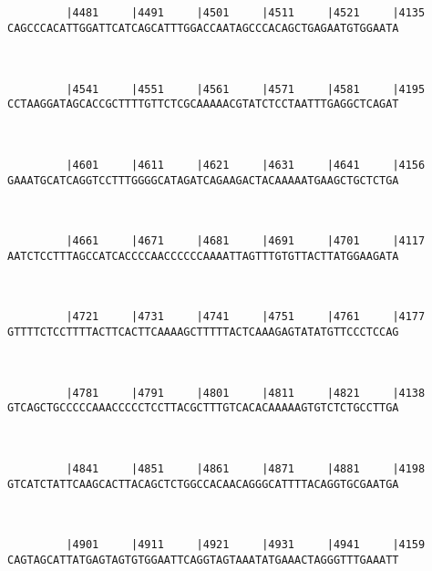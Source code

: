 \documentclass{article}
\begin{document}
\begin{Verbatim}
                                                            
   
         |4481     |4491     |4501     |4511     |4521     |4135
CAGCCCACATTGGATTCATCAGCATTTGGACCAATAGCCCACAGCTGAGAATGTGGAATA
                                                            
                                                            
   
         |4541     |4551     |4561     |4571     |4581     |4195
CCTAAGGATAGCACCGCTTTTGTTCTCGCAAAAACGTATCTCCTAATTTGAGGCTCAGAT
                                                            
                                                            
   
         |4601     |4611     |4621     |4631     |4641     |4156
GAAATGCATCAGGTCCTTTGGGGCATAGATCAGAAGACTACAAAAATGAAGCTGCTCTGA
                                                            
                                                            
   
         |4661     |4671     |4681     |4691     |4701     |4117
AATCTCCTTTAGCCATCACCCCAACCCCCCAAAATTAGTTTGTGTTACTTATGGAAGATA
                                                            
                                                            
   
         |4721     |4731     |4741     |4751     |4761     |4177
GTTTTCTCCTTTTACTTCACTTCAAAAGCTTTTTACTCAAAGAGTATATGTTCCCTCCAG
                                                            
                                                            
   
         |4781     |4791     |4801     |4811     |4821     |4138
GTCAGCTGCCCCCAAACCCCCTCCTTACGCTTTGTCACACAAAAAGTGTCTCTGCCTTGA
                                                            
                                                            
   
         |4841     |4851     |4861     |4871     |4881     |4198
GTCATCTATTCAAGCACTTACAGCTCTGGCCACAACAGGGCATTTTACAGGTGCGAATGA
                                                            
                                                            
   
         |4901     |4911     |4921     |4931     |4941     |4159
CAGTAGCATTATGAGTAGTGTGGAATTCAGGTAGTAAATATGAAACTAGGGTTTGAAATT
                                                            

\end{Verbatim}
\end{document}
